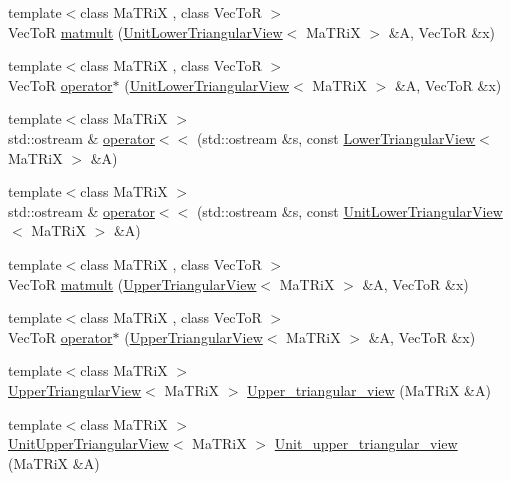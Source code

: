 \begin{DoxyCompactItemize}
{\footnotesize template$<$class MaTRiX , class VecToR $>$ }\\VecToR \hyperlink{namespace_t_n_t_af74e1fac28c8406c36b258e55bf5326a}{matmult} (\hyperlink{class_t_n_t_1_1_unit_lower_triangular_view}{UnitLowerTriangularView}$<$ MaTRiX $>$ \&A, VecToR \&x)
\item 
{\footnotesize template$<$class MaTRiX , class VecToR $>$ }\\VecToR \hyperlink{namespace_t_n_t_aca19c482e86fce8aca0c10df28530ea5}{operator$\ast$} (\hyperlink{class_t_n_t_1_1_unit_lower_triangular_view}{UnitLowerTriangularView}$<$ MaTRiX $>$ \&A, VecToR \&x)
\item 
{\footnotesize template$<$class MaTRiX $>$ }\\std::ostream \& \hyperlink{namespace_t_n_t_af6633d08f9d920927d0fd3892874d28d}{operator$<$$<$} (std::ostream \&s, const \hyperlink{class_t_n_t_1_1_lower_triangular_view}{LowerTriangularView}$<$ MaTRiX $>$ \&A)
\item 
{\footnotesize template$<$class MaTRiX $>$ }\\std::ostream \& \hyperlink{namespace_t_n_t_ac779a63cddc53f6fd24af785fd4774af}{operator$<$$<$} (std::ostream \&s, const \hyperlink{class_t_n_t_1_1_unit_lower_triangular_view}{UnitLowerTriangularView}$<$ MaTRiX $>$ \&A)
\item 
{\footnotesize template$<$class MaTRiX , class VecToR $>$ }\\VecToR \hyperlink{namespace_t_n_t_a97afecf249baccab980dcdbbded05383}{matmult} (\hyperlink{class_t_n_t_1_1_upper_triangular_view}{UpperTriangularView}$<$ MaTRiX $>$ \&A, VecToR \&x)
\item 
{\footnotesize template$<$class MaTRiX , class VecToR $>$ }\\VecToR \hyperlink{namespace_t_n_t_aebcd6d9252089216cd968783fa517ccc}{operator$\ast$} (\hyperlink{class_t_n_t_1_1_upper_triangular_view}{UpperTriangularView}$<$ MaTRiX $>$ \&A, VecToR \&x)
\item 
{\footnotesize template$<$class MaTRiX $>$ }\\\hyperlink{class_t_n_t_1_1_upper_triangular_view}{UpperTriangularView}$<$ MaTRiX $>$ \hyperlink{namespace_t_n_t_ade864e062e895553747f054a3bccc37f}{Upper\_\-triangular\_\-view} (MaTRiX \&A)
\item 
{\footnotesize template$<$class MaTRiX $>$ }\\\hyperlink{class_t_n_t_1_1_unit_upper_triangular_view}{UnitUpperTriangularView}$<$ MaTRiX $>$ \hyperlink{namespace_t_n_t_a2462e1f2d5aba69f02cf739ed6d716a1}{Unit\_\-upper\_\-triangular\_\-view} (MaTRiX \&A)

\end{DoxyCompactItemize}
